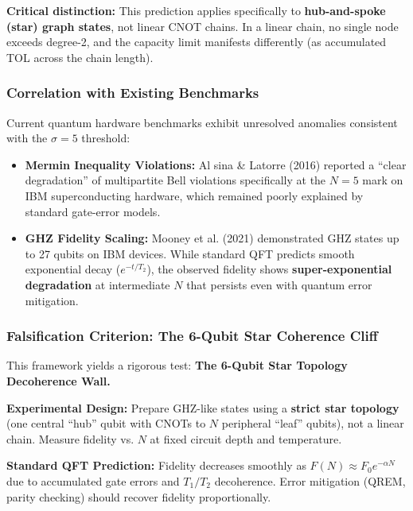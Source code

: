 \textbf{Critical distinction:} This prediction applies specifically to \textbf{hub-and-spoke (star) graph states}, not linear CNOT chains. In a linear chain, no single node exceeds degree-2, and the capacity limit manifests differently (as accumulated TOL across the chain length).

\subsubsection{Correlation with Existing Benchmarks}

Current quantum hardware benchmarks exhibit unresolved anomalies consistent with the $\sigma=5$ threshold:

\begin{itemize}
    \item \textbf{Mermin Inequality Violations:} Al
sina \& Latorre (2016) \cite{alsina2016} reported a ``clear degradation'' of multipartite Bell violations specifically at the $N=5$ mark on IBM superconducting hardware, which remained poorly explained by standard gate-error models.
    \item \textbf{GHZ Fidelity Scaling:} Mooney et al. (2021) \cite{mooney2021} demonstrated GHZ states up to 27 qubits on IBM devices. While standard QFT predicts smooth exponential decay ($e^{-t/T_2}$), the observed fidelity shows \textbf{super-exponential degradation} at intermediate $N$ that persists even with quantum error mitigation.
\end{itemize}

\subsubsection{Falsification Criterion: The 6-Qubit Star Coherence Cliff}

This framework yields a rigorous test: \textbf{The 6-Qubit Star Topology Decoherence Wall.}

\textbf{Experimental Design:} Prepare GHZ-like states using a \textbf{strict star topology} (one central ``hub'' qubit with CNOTs to $N$ peripheral ``leaf'' qubits), not a linear chain. Measure fidelity vs. $N$ at fixed circuit depth and temperature.

\textbf{Standard QFT Prediction:} Fidelity decreases smoothly as $F(N) \approx F_0 e^{-\alpha N}$ due to accumulated gate errors and $T_1/T_2$ decoherence. Error mitigation (QREM, parity checking) should recover fidelity proportionally.

